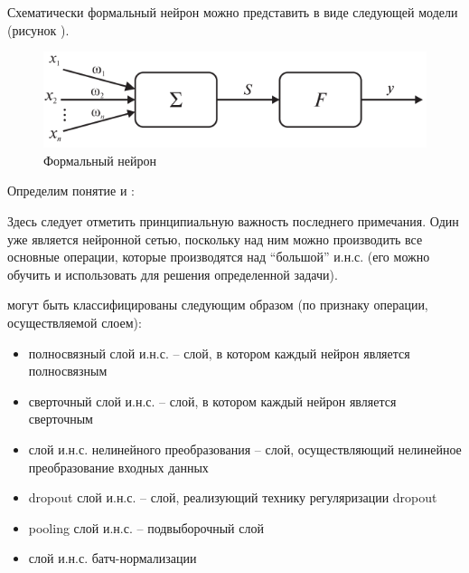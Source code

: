 Схематически формальный нейрон можно представить в виде следующей модели (рисунок \textit{}).

\begin{figure}[H]
	\includegraphics[scale=0.8]{author/part3/figures/formal_neuron.png}
	\caption{Формальный нейрон}
	\label{fig:formal_neuron}
\end{figure}

Определим понятие  и :

\begin{SCn}
\end{SCn}


\begin{SCn}
\end{SCn}

Здесь следует отметить принципиальную важность последнего примечания. Один   уже является нейронной сетью, поскольку над ним можно производить все основные операции, которые производятся над ``большой'' {и.н.с.} (его можно обучить и использовать для решения определенной задачи).

 могут быть классифицированы следующим образом (по признаку операции, осуществляемой слоем):
\begin{itemize}
		\item полносвязный слой и.н.с. -- слой, в котором каждый нейрон является полносвязным
		\item сверточный слой и.н.с. -- слой, в котором каждый нейрон является сверточным
		\item слой и.н.с. нелинейного преобразования -- слой, осуществляющий нелинейное преобразование входных данных
		\item dropout слой и.н.с. -- слой, реализующий технику регуляризации dropout
		\item pooling слой и.н.с. -- подвыборочный слой
		\item слой и.н.с. батч-нормализации
\end{itemize}


